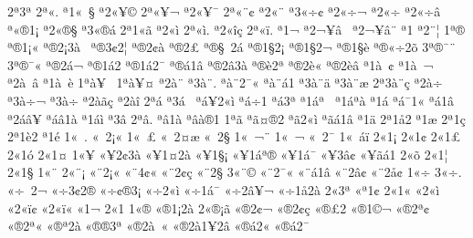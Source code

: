 {2^^aa3^^aa
2^^aa^^ab.
^^aa1^^ab^^a0^^a7
^^aa2^^ab^^a5^^a9
2^^aa^^ab^^a5^^ac
^^aa2^^ab^^a5^^af
2^^aa^^ab^^a8^^a2
^^aa2^^ab^^a8^^ad
^^aa3^^ab^^f7^^a2
^^aa2^^ab^^f7^^ac
^^aa2^^ab^^f7^^ad
^^aa2^^ab^^f7^^e2
^^aa^^ab^^ae1^^a1
^^aa2^^ab^^ae^^a7
^^aa3^^ab^^ae^^e1
2^^aa1^^ab^^e3
^^aa2^^ab^^ec
2^^aa^^ab^^ec.
^^aa2^^ab^^ee^^e7
2^^aa^^ab^^ef.
^^aa1^^ac
^^aa2^^ac^^a5^^e2^^a0
^^aa2^^ac^^a5^^e2^^a8
^^aa1^^ad
^^aa2^^ad^^a8^^a6
1^^aa^^ae
^^aa^^ae1^^a1^^ab
^^aa^^ae2^^a13^^e0^^a0
^^aa^^ae3^^a22^^a6
^^aa^^ae2^^a2^^e0
^^aa^^ae2^^a3^^ad
^^aa^^ae^^a7^^a02^^e1
^^aa^^ae1^^a72^^a1
^^aa^^ae1^^a72^^ac
^^aa^^ae1^^a7^^e8
^^aa^^ae^^ab^^f72^^f5
3^^aa^^ae^^af^^a8
3^^aa^^ae^^af^^ab
^^aa^^ae2^^e1^^ac
^^aa^^ae1^^e12^^ad
^^aa^^ae1^^e12^^af
^^aa^^ae^^e11^^e2
^^aa^^ae2^^e23^^e0
^^aa^^ae^^e82^^aa
^^aa^^ae2^^e8^^ab
^^aa^^ae2^^e8^^e2
^^aa1^^e0^^a0^^a2
^^aa1^^e0^^a0^^ac
^^aa2^^e0^^a0^^e2^^ad
^^aa1^^e0^^a0^^e8
1^^aa^^e0^^a5^^a0
1^^aa^^e0^^a5^^a4
^^aa2^^e0^^a8
^^aa3^^e0^^a8.
^^aa^^e0^^a82^^af^^ab
^^aa^^e0^^a8^^e11
^^aa3^^e0^^a8^^e4
^^aa3^^e0^^a8^^e6
2^^aa3^^e0^^a8^^e7
^^aa2^^e0^^f7
^^aa3^^e0^^f7^^ac
^^aa3^^e0^^f7^^ad
^^aa2^^e0^^e3^^e7
^^aa2^^e0^^ee
2^^aa^^e1
^^aa3^^e1^^a0
^^aa^^e1^^a52^^ab^^ec
^^aa^^e1^^f71
^^aa^^e13^^aa
^^aa1^^e1^^aa^^a0
^^aa1^^e1^^aa^^e0
^^aa1^^e1^^ad
^^aa^^e1^^af1^^ab
^^aa^^e11^^e2
^^aa2^^e1^^e2^^a5
^^aa^^e1^^e21^^e0
^^aa1^^e1^^ec
^^aa3^^e2
2^^aa^^e2.
^^aa^^e21^^e0
^^aa^^e2^^e0^^ae1
1^^aa^^e3
^^aa^^e3^^a4^^ae2
^^aa^^e32^^ab^^ec
^^aa^^e3^^e11^^e2
^^aa1^^e4
2^^aa1^^e52
^^aa1^^e6
2^^aa1^^e7
2^^aa1^^e82
^^aa1^^e9
1^^ab^^a0.
^^ab^^a02^^a1^^ab
1^^ab^^a0^^a3
^^ab^^a02^^a4^^e6
^^ab^^a02^^a7^^ad
1^^ab^^a0^^ac^^a8
1^^ab^^a0^^ac^^ad
^^ab^^a02^^af^^ad
1^^ab^^a0^^e1^^ef
2^^ab1^^a1
2^^ab1^^a2
2^^ab1^^a3
2^^ab1^^f3
2^^ab1^^a4
1^^ab^^a5
^^ab^^a52^^a23^^e0
^^ab^^a51^^a42^^e0
^^ab^^a51^^a7^^a1
^^ab^^a51^^e1^^aa^^ae
^^ab^^a51^^e1^^af
^^ab^^a53^^e2^^a2
^^ab^^a5^^e3^^e11
2^^ab^^f5
2^^ab1^^a6
2^^ab1^^a7
1^^ab^^a8
2^^ab^^a8^^a1
^^ab^^a82^^a1^^ab
^^ab^^a84^^a2^^ab
^^ab^^a82^^a2^^e7
^^ab^^a82^^a7^^ad
3^^ab^^a8^^a9
^^ab^^a82^^af^^ab
^^ab^^a8^^e11^^e2
^^ab^^a82^^e2^^a2
^^ab^^a82^^e5^^a2
1^^ab^^f7
3^^ab^^f7.
^^ab^^f7^^a02^^ac
^^ab^^f73^^a22^^ae
^^ab^^f7^^a2^^ae3^^a1
^^ab^^f72^^ab^^ec
^^ab^^f71^^e1^^af
^^ab^^f72^^e2^^a5^^ac
^^ab^^f71^^e52^^e0
2^^ab3^^aa
^^ab^^aa1^^a2
2^^ab1^^ab
^^ab2^^ab^^ec
^^ab2^^ab^^ef^^a2
^^ab2^^ab^^ef^^ab
^^ab1^^ac
2^^ab1^^ad
1^^ab^^ae
^^ab^^ae1^^a12^^e0
2^^ab^^ae^^a1^^e3
^^ab^^ae2^^a2^^ac
^^ab^^ae2^^a2^^e7
^^ab^^ae^^a32
^^ab^^ae1^^a9^^ac
^^ab^^ae2^^aa^^a2
^^ab^^ae2^^aa^^ab
^^ab^^ae^^aa2^^e0
^^ab^^ae^^ae3^^aa
^^ab^^ae2^^e0^^a0^^ab
^^ab^^ae2^^e01^^a52^^e2
^^ab^^ae^^e12^^ab
^^ab^^ae^^e12^^af
}
